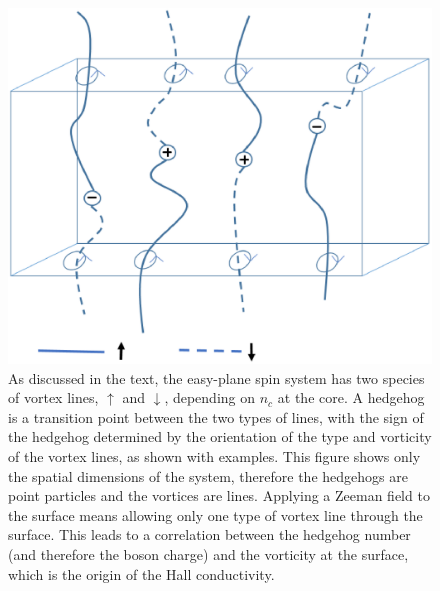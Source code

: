 \begin{figure}
\includegraphics[width=\linewidth]{figures/monopoles.eps}
\caption{As discussed in the text, the easy-plane spin system has two species of vortex lines, $\uparrow$ and $\downarrow$, depending on $n_c$ at the core. A hedgehog is a transition point between the two types of lines, with the sign of the hedgehog determined by the orientation of the type and vorticity of the vortex lines, as shown with examples. This figure shows only the spatial dimensions of the system, therefore the hedgehogs are point particles and the vortices are lines. Applying a Zeeman field to the surface means allowing only one type of vortex line through the surface. This leads to a correlation between the hedgehog number (and therefore the boson charge) and the vorticity at the surface, which is the origin of the Hall conductivity.}
\label{monopoles}
\end{figure}



